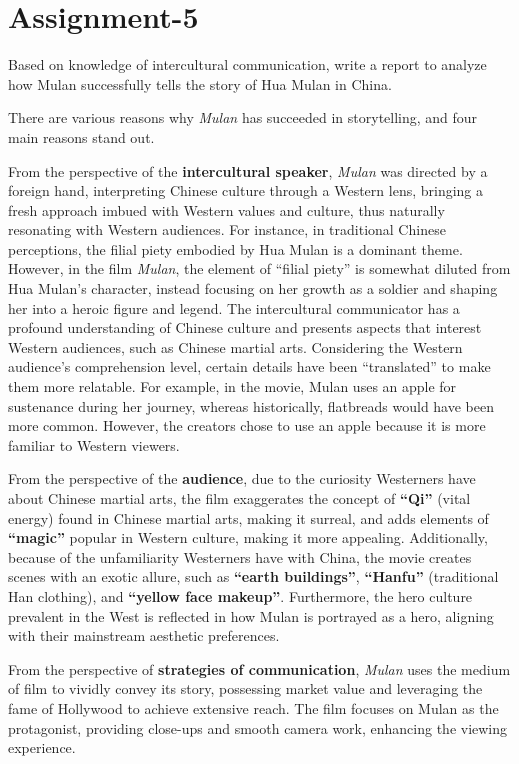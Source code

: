 \section{Assignment-5}

\begin{question}{}{}
    Based on knowledge of intercultural communication, write a report to analyze how Mulan successfully tells the story of Hua Mulan in China.
\end{question}

There are various reasons why \textit{Mulan} has succeeded in storytelling, and four main reasons stand out.

From the perspective of the \textbf{intercultural speaker}, \textit{Mulan} was directed by a foreign hand, interpreting Chinese culture through a Western lens, bringing a fresh approach imbued with Western values and culture, thus naturally resonating with Western audiences. For instance, in traditional Chinese perceptions, the filial piety embodied by Hua Mulan is a dominant theme. However, in the film \textit{Mulan}, the element of ``filial piety'' is somewhat diluted from Hua Mulan's character, instead focusing on her growth as a soldier and shaping her into a heroic figure and legend. The intercultural communicator has a profound understanding of Chinese culture and presents aspects that interest Western audiences, such as Chinese martial arts. Considering the Western audience's comprehension level, certain details have been ``translated'' to make them more relatable. For example, in the movie, Mulan uses an apple for sustenance during her journey, whereas historically, flatbreads would have been more common. However, the creators chose to use an apple because it is more familiar to Western viewers.

From the perspective of the \textbf{audience}, due to the curiosity Westerners have about Chinese martial arts, the film exaggerates the concept of \textbf{``Qi''} (vital energy) found in Chinese martial arts, making it surreal, and adds elements of \textbf{``magic''} popular in Western culture, making it more appealing. Additionally, because of the unfamiliarity Westerners have with China, the movie creates scenes with an exotic allure, such as \textbf{``earth buildings''}, \textbf{``Hanfu''} (traditional Han clothing), and \textbf{``yellow face makeup''}. Furthermore, the hero culture prevalent in the West is reflected in how Mulan is portrayed as a hero, aligning with their mainstream aesthetic preferences.

From the perspective of \textbf{strategies of communication}, \textit{Mulan} uses the medium of film to vividly convey its story, possessing market value and leveraging the fame of Hollywood to achieve extensive reach. The film focuses on Mulan as the protagonist, providing close-ups and smooth camera work, enhancing the viewing experience.


